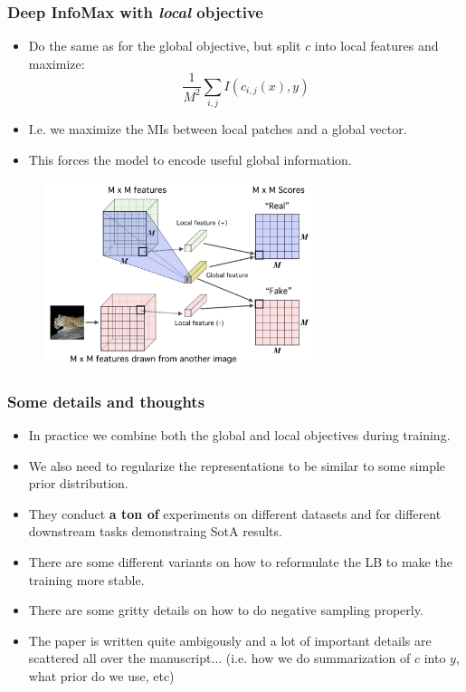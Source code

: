 \documentclass[10pt]{beamer}
\begin{document}
\begin{frame}
\frametitle{Deep InfoMax with \textit{local} objective}
\begin{itemize}
    \item\pause Do the same as for the global objective, but split $c$ into local features and maximize:
    \begin{equation*}
    \frac{1}{M^2}\sum_{i,j}I(c_{i,j}(x), y)
    \end{equation*}
    \item\pause I.e. we maximize the MIs between local patches and a global vector.
    \item\pause This forces the model to encode useful global information.
\end{itemize}

\pause
\begin{figure}
\centering
\includegraphics[width=0.7\textwidth]{images/dim_local.png}
\end{figure}

\end{frame}


\begin{frame}
\frametitle{Some details and thoughts}

\begin{itemize}
    \item\pause In practice we combine both the global and local objectives during training.
    \item\pause We also need to regularize the representations to be similar to some simple prior distribution.
    \item\pause They conduct \textbf{a ton of} experiments on different datasets and for different downstream tasks demonstraing SotA results.
    \item\pause There are some different variants on how to reformulate the LB to make the training more stable.
    \item\pause There are some gritty details on how to do negative sampling properly.
    \item\pause The paper is written quite ambigously and a lot of important details are scattered all over the manuscript... (i.e. how we do summarization of $c$ into $y$, what prior do we use, etc)
\end{itemize}
\end{frame}
\end{document}
